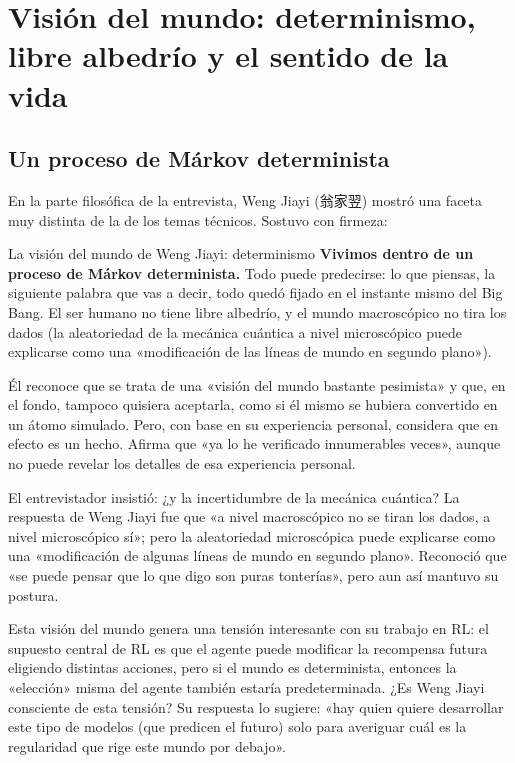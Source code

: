 \section{Visión del mundo: determinismo, libre albedrío y el sentido de la vida}

\subsection{Un proceso de Márkov determinista}

En la parte filosófica de la entrevista, Weng Jiayi (翁家翌) mostró una faceta muy distinta de la de los temas técnicos. Sostuvo con firmeza:

\begin{importantbox}{La visión del mundo de Weng Jiayi: determinismo}
\textbf{Vivimos dentro de un proceso de Márkov determinista.} Todo puede predecirse: lo que piensas, la siguiente palabra que vas a decir, todo quedó fijado en el instante mismo del Big Bang. El ser humano no tiene libre albedrío, y el mundo macroscópico no tira los dados (la aleatoriedad de la mecánica cuántica a nivel microscópico puede explicarse como una «modificación de las líneas de mundo en segundo plano»).
\end{importantbox}

Él reconoce que se trata de una «visión del mundo bastante pesimista» y que, en el fondo, tampoco quisiera aceptarla, como si él mismo se hubiera convertido en un átomo simulado. Pero, con base en su experiencia personal, considera que en efecto es un hecho. Afirma que «ya lo he verificado innumerables veces», aunque no puede revelar los detalles de esa experiencia personal.

El entrevistador insistió: ¿y la incertidumbre de la mecánica cuántica? La respuesta de Weng Jiayi fue que «a nivel macroscópico no se tiran los dados, a nivel microscópico sí»; pero la aleatoriedad microscópica puede explicarse como una «modificación de algunas líneas de mundo en segundo plano». Reconoció que «se puede pensar que lo que digo son puras tonterías», pero aun así mantuvo su postura.

Esta visión del mundo genera una tensión interesante con su trabajo en RL: el supuesto central de RL es que el agente puede modificar la recompensa futura eligiendo distintas acciones, pero si el mundo es determinista, entonces la «elección» misma del agente también estaría predeterminada. ¿Es Weng Jiayi consciente de esta tensión? Su respuesta lo sugiere: «hay quien quiere desarrollar este tipo de modelos (que predicen el futuro) solo para averiguar cuál es la regularidad que rige este mundo por debajo».


